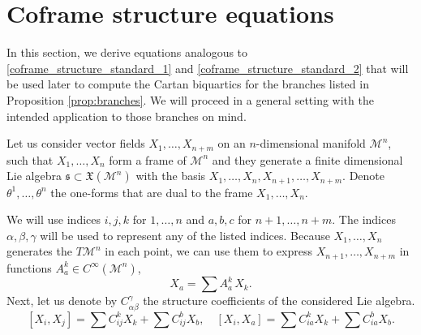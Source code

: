 \documentclass{amsart}
\theoremstyle{plain}
\theoremstyle{definition}
\theoremstyle{remark}
\newcommand{\mc}[1]{\mathcal{#1}}
\newcommand{\mfk}[1]{\mathfrak{#1}}
\begin{document}
\section{Coframe structure equations} \label{section:coframe_structure}
%
In this section, we derive equations analogous to \eqref{coframe_structure_standard_1} and \eqref{coframe_structure_standard_2} that will be used later to compute the Cartan biquartics for the branches listed in Proposition \ref{prop:branches}. We will proceed in a general setting with the intended application to those branches on mind.

Let us consider vector fields $X_1, \dots, X_{n+m}$ on an $n$-dimensional manifold $\mc{M}^n$, such that $X_1,\dots, X_n$ form a frame of $\mc{M}^n$ and they generate a finite dimensional Lie algebra $\mfk{s} \subset \mfk{X}(\mc{M}^n)$ with the basis $X_1, \dots, X_n,X_{n+1}, \dots, X_{n+m}$. Denote $\theta^1,\dots,\theta^n$ the one-forms that are dual to the frame $X_1,\dots,X_n$.

We will use indices $i,j,k$ for $1, \dots, n$ and $a,b,c$ for $n+1,\dots,n+m$. The indices $\alpha,\beta,\gamma$ will be used to represent any of the listed indices. Because $X_1, \dots, X_n$ generates the $T\mc{M}^n$ in each point, we can use them to express $X_{n+1}, \dots, X_{n+m}$ in functions $A_a^k \in C^\infty (\mc{M}^n)$,
\begin{equation} \label{Aak_functions}
    X_a = \sum A_a^k \,X_k .
\end{equation}
Next, let us denote by $C_{\alpha \beta}^\gamma$ %
the structure coefficients of the considered Lie algebra.
\begin{equation} \label{structure_coefficients}
    [X_i,X_j] = \sum C_{ij}^k X_k + \sum C_{ij}^b X_b, \quad [X_i,X_a] = \sum C_{ia}^k X_k + \sum C_{ia}^b X_b.
\end{equation}
\end{document}
